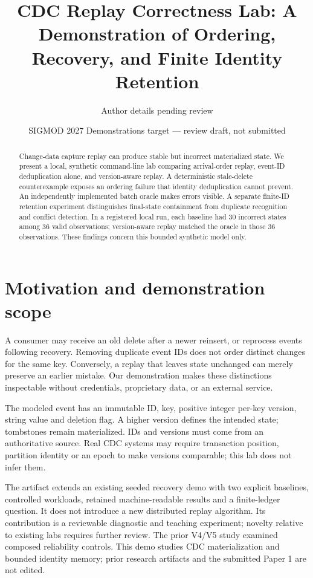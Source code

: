 \documentclass[10pt,twocolumn]{article}
\title{CDC Replay Correctness Lab: A Demonstration of Ordering, Recovery, and Finite Identity Retention}
\author{Author details pending review}
\date{SIGMOD 2027 Demonstrations target --- review draft, not submitted}
\begin{document}
\maketitle
\begin{abstract}
Change-data capture replay can produce stable but incorrect materialized state.
We present a local, synthetic command-line lab comparing arrival-order replay,
event-ID deduplication alone, and version-aware replay. A deterministic stale-delete
counterexample exposes an ordering failure that identity deduplication cannot prevent.
An independently implemented batch oracle makes errors visible. A separate finite-ID
retention experiment distinguishes final-state containment from duplicate recognition
and conflict detection. In a registered local run, each baseline had 30 incorrect
states among 36 valid observations; version-aware replay matched the oracle in those
36 observations. These findings concern this bounded synthetic model only.
\end{abstract}
\section{Motivation and demonstration scope}
A consumer may receive an old delete after a newer reinsert, or reprocess events
following recovery. Removing duplicate event IDs does not order distinct changes
for the same key. Conversely, a replay that leaves state unchanged can merely
preserve an earlier mistake. Our demonstration makes these distinctions inspectable
without credentials, proprietary data, or an external service.

The modeled event has an immutable ID, key, positive integer per-key version,
string value and deletion flag. A higher version defines the intended state;
tombstones remain materialized. IDs and versions must come from an authoritative
source. Real CDC systems may require transaction position, partition identity or
an epoch to make versions comparable; this lab does not infer them.

The artifact extends an existing seeded recovery demo with two explicit baselines,
controlled workloads, retained machine-readable results and a finite-ledger question.
It does not introduce a new distributed replay algorithm. Its contribution is a
reviewable diagnostic and teaching experiment; novelty relative to existing labs
requires further review. The prior V4/V5 study examined composed reliability controls.
This demo studies CDC materialization and bounded identity memory; prior research
artifacts and the submitted Paper 1 are not edited.
\end{document}
